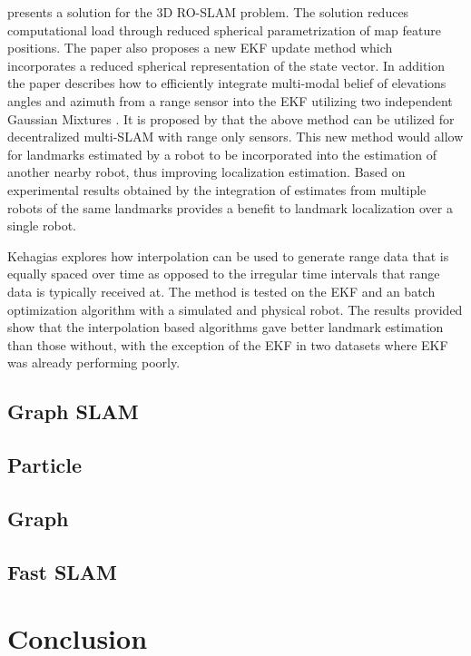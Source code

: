 \documentclass[conference]{IEEEtran}
\begin{document}
\cite{Fabresse2013} presents a solution for the 3D RO-SLAM problem. The solution reduces computational load through reduced spherical parametrization of map feature positions. The paper also proposes a new EKF update method which incorporates a reduced spherical representation of the state vector. In addition the paper describes how to efficiently integrate multi-modal belief of elevations angles and azimuth from a range sensor into the EKF utilizing two independent Gaussian Mixtures \cite{Fabresse2013}. It is proposed by \cite{Fabresse2015} that the above method can be utilized for decentralized multi-SLAM with range only sensors. This new method would allow for landmarks estimated by a robot to be incorporated into the estimation of another nearby robot, thus improving localization estimation. Based on experimental results obtained by \cite{Fabresse2015} the integration of estimates from multiple robots of the same landmarks provides a benefit to landmark localization over a single robot.

Kehagias explores how interpolation can be used to generate range data that is equally spaced over time as opposed to the irregular time intervals that range data is typically received at. \cite{Kehagias2006} The method is tested on the EKF and an batch optimization algorithm with a simulated and physical robot. The results provided show that the interpolation based algorithms gave better landmark estimation than those without, with the exception of the EKF in two datasets where EKF was already performing poorly.









\subsection{Graph SLAM}
\subsection{Particle}
\subsection{Graph}
\subsection{Fast SLAM}

\section{Conclusion}


	
	
	
\end{document}
